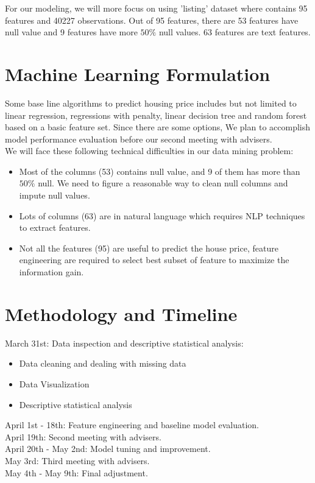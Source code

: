 \documentclass{article}
\begin{document}
\noindent For our modeling, we will more focus on using 'listing' dataset where contains 95 features and 40227 observations. Out of 95 features, there are 53 features have null value and 9 features have more $50\%$ null values. 63 features are text features. 

\section{Machine Learning Formulation}
Some base line algorithms to predict housing price includes but not limited to linear regression, regressions with penalty, linear decision tree and random forest based on a basic feature set.  Since there are some options, We plan to accomplish model performance evaluation before our second meeting with advisers.\\

We will face these following technical difficulties in our data mining problem:
\begin{itemize}
\item Most of the columns (53) contains null value, and 9 of them has more than $50\%$ null. We need to figure a reasonable way to clean null columns and impute null values.
\item Lots of columns (63) are in natural language which requires NLP techniques to extract features.
\item Not all the features (95) are useful to predict the house price, feature engineering are required to select best subset of feature to maximize the information gain.   

\end{itemize}



\section{Methodology and Timeline}

\noindent March 31st: Data inspection and descriptive statistical analysis:
\begin{itemize}
\item Data cleaning and dealing with missing data
\item Data Visualization
\item Descriptive statistical analysis
\end{itemize}

\noindent April 1st - 18th: Feature engineering and baseline model evaluation.\\
\noindent April 19th: Second meeting with advisers.\\
\noindent April 20th - May 2nd: Model tuning and  improvement.\\
\noindent May 3rd: Third meeting with advisers.\\
\noindent May 4th - May 9th: Final adjustment.\\
\end{document}
